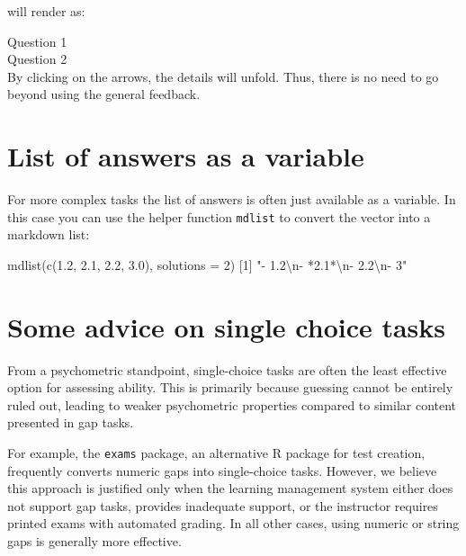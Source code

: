\documentclass[twoside]{tufte-book}
\newenvironment{Shaded}{}{}
\newcommand{\AttributeTok}[1]{\textcolor[rgb]{0.49,0.56,0.16}{#1}}
\newcommand{\DecValTok}[1]{\textcolor[rgb]{0.25,0.63,0.44}{#1}}
\newcommand{\FloatTok}[1]{\textcolor[rgb]{0.25,0.63,0.44}{#1}}
\newcommand{\FunctionTok}[1]{\textcolor[rgb]{0.02,0.16,0.49}{#1}}
\newcommand{\NormalTok}[1]{#1}
\newcommand{\SpecialCharTok}[1]{\textcolor[rgb]{0.25,0.44,0.63}{#1}}
\newcommand{\StringTok}[1]{\textcolor[rgb]{0.25,0.44,0.63}{#1}}
\begin{document}
will render as:

\noindent\textrightarrow{} Question 1\\
\noindent\textrightarrow{} Question 2\\

By clicking on the arrows, the details will unfold. Thus, there is no need to go beyond using the general feedback.

\section{List of answers as a variable}\label{list-of-answers-as-a-variable}

For more complex tasks the list of answers is often just available as a variable. In this case you can use the helper function \texttt{mdlist} to convert the vector into a markdown list:

\begin{Shaded}
\begin{Highlighting}[]
\FunctionTok{mdlist}\NormalTok{(}\FunctionTok{c}\NormalTok{(}\FloatTok{1.2}\NormalTok{, }\FloatTok{2.1}\NormalTok{, }\FloatTok{2.2}\NormalTok{, }\FloatTok{3.0}\NormalTok{), }\AttributeTok{solutions =} \DecValTok{2}\NormalTok{)}
\NormalTok{[}\DecValTok{1}\NormalTok{] }\StringTok{"{-} 1.2}\SpecialCharTok{\textbackslash{}n}\StringTok{{-} *2.1*}\SpecialCharTok{\textbackslash{}n}\StringTok{{-} 2.2}\SpecialCharTok{\textbackslash{}n}\StringTok{{-} 3"}
\end{Highlighting}
\end{Shaded}

\section{Some advice on single choice tasks}\label{some-advice-on-single-choice-tasks}

From a psychometric standpoint, single-choice tasks are often the least effective option for assessing ability. This is primarily because guessing cannot be entirely ruled out, leading to weaker psychometric properties compared to similar content presented in gap tasks.

For example, the \texttt{exams} package, an alternative R package for test creation, frequently converts numeric gaps into single-choice tasks. However, we believe this approach is justified only when the learning management system either does not support gap tasks, provides inadequate support, or the instructor requires printed exams with automated grading. In all other cases, using numeric or string gaps is generally more effective.
\end{document}
